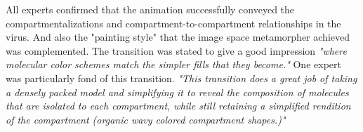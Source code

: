 









All experts confirmed that the animation successfully conveyed the compartmentalizations and compartment-to-compartment relationships in the virus. And also the "painting style" that the image space metamorpher achieved was complemented. The transition was stated to give a good impression \textit{"where molecular color schemes match the simpler fills that they become."}
One expert was particularly fond of this transition. \textit{"This transition does a great job of taking a densely packed model and simplifying it to reveal the composition of molecules that are isolated to each compartment, while still retaining a simplified rendition of the compartment (organic wavy colored compartment shapes.)"}

